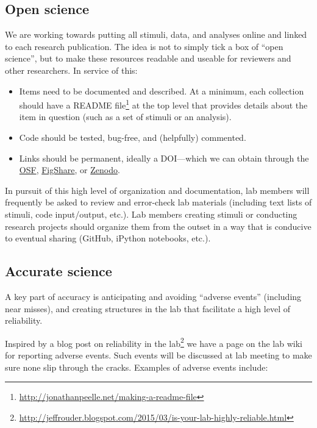 \documentclass[letterpaper,12pt,oneside]{memoir}
\begin{document}
{\subsection{Open science}

We are working towards putting all stimuli, data, and analyses online and linked to each research publication. The idea is not to simply tick a box of ``open science'', but to make these resources readable and useable for reviewers and other researchers. In service of this:

\begin{itemize}
\item Items need to be documented and described. At a minimum, each collection should have a README file\footnote{\url{http://jonathanpeelle.net/making-a-readme-file}} at the top level that provides details about the item in question (such as a set of stimuli or an analysis).

\item Code should be tested, bug-free, and (helpfully) commented.

\item Links should be permanent, ideally a DOI---which we can obtain through the \href{http://help.osf.io/m/sharing/l/524208-create-dois-and-arks}{OSF}, \href{https://figshare.com/}{FigShare}, or \href{https://zenodo.org/}{Zenodo}.
\end{itemize}

In pursuit of this high level of organization and documentation, lab members will frequently be asked to review and error-check lab materials (including text lists of stimuli, code input/output, etc.). Lab members creating stimuli or conducting research projects should organize them from the outset in a way that is conducive to eventual sharing (GitHub, iPython notebooks, etc.).


\subsection{Accurate science}

A key part of accuracy is anticipating and avoiding ``adverse events'' (including near misses), and creating structures in the lab that facilitate a high level of reliability.

Inspired by a blog post on reliability in the lab\footnote{\url{http://jeffrouder.blogspot.com/2015/03/is-your-lab-highly-reliable.html}} we have a page on the lab wiki for reporting adverse events. Such events will be discussed at lab meeting to make sure none slip through the cracks. Examples of adverse events include:

}
\end{document}
